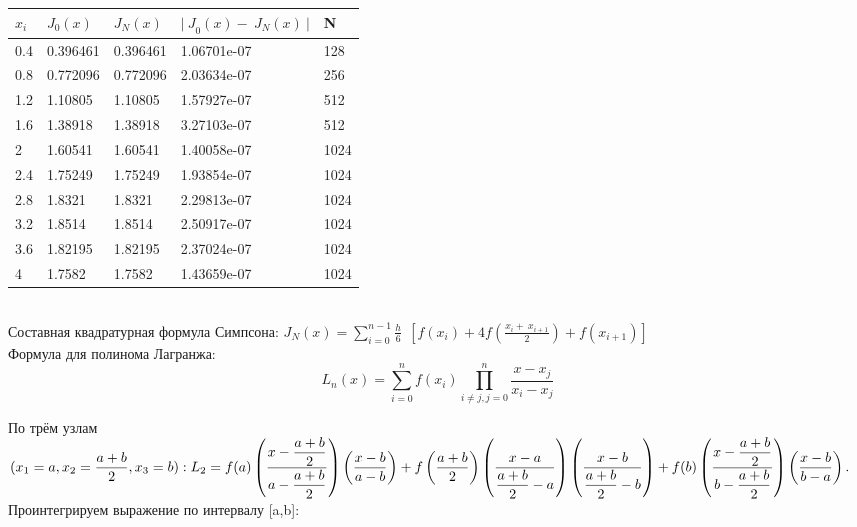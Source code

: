 \documentclass[12pt,a4paper]{report}
\begin{document}
{	\begin{center}
		\begin{tabular}{ | l | l | l | l | l | }
			\hline
			$x_i$	& $J_0(x)$	& $J_N(x)$	& ${|\ J}_0\left(x\right)-\ J_N\left(x\right)\ |$	& N \\
			\hline
			0.4	    & 0.396461	& 0.396461	& 1.06701e-07	                                    & 128\\
		    \hline
			0.8	    & 0.772096	& 0.772096	& 2.03634e-07	                                    & 256\\
			\hline
			1.2	    & 1.10805	& 1.10805	& 1.57927e-07	                                    & 512\\
			\hline
			1.6	    & 1.38918	& 1.38918	& 3.27103e-07	                                    & 512\\
			\hline
			2	    & 1.60541	& 1.60541	& 1.40058e-07	                                    & 1024\\
			\hline
			2.4	    & 1.75249	& 1.75249	& 1.93854e-07	                                    & 1024\\
			\hline
			2.8	    & 1.8321	& 1.8321	& 2.29813e-07	                                    & 1024\\
			\hline
			3.2	    & 1.8514	& 1.8514	& 2.50917e-07	                                    & 1024\\
			\hline
			3.6	    & 1.82195	& 1.82195	& 2.37024e-07	                                    & 1024\\
			\hline
			4	    & 1.7582	& 1.7582	& 1.43659e-07	                                    & 1024\\
			\hline
		\end{tabular}
	\end{center}
	
	\noindent \\Составная квадратурная формула Симпсона:
	\newline 
	$J_N\left(x\right)=\displaystyle\sum_{i=0}^{n-1}\frac{h}{6}\ \ \left[f\left(x_i\right)+4f\left(\frac{x_i+\ x_{i+1}}{2}\right)+f\left(x_{i+1}\right)\right]\ \ $\\
	
	Формула для полинома Лагранжа:
	\begin{equation}
		L_n(x) = \sum_{i=0}^{n}f(x_i)\prod_{i \ne j, j = 0}^{n}\frac{x - x_j}{x_i - x_j}
    \end{equation}
    
    По трём узлам $(x_1 = a, x_2 = \dfrac{a+b}{2}, x_3 = b):
    L_2 = f(a)\left(\dfrac{x - \dfrac{a+b}{2}}{a - \dfrac{a+b}{2}}\right)\left(\dfrac{x - b}{a - b}\right)+\\
    f\left(\dfrac{a +b}{2}\right)\left(\dfrac{x-a}{\dfrac{a+b}{2} - a}\right)\left(\dfrac{x-b}{\dfrac{a+b}{2} - b}\right)+ f(b)\left(\dfrac{x - \dfrac{a+b}{2}}{b - \dfrac{a+b}{2}}\right)\left(\dfrac{x - b}{b - a}\right).$\\
    \hfill\break
    Проинтегрируем выражение по интервалу [a,b]:
    
}
\end{document}
